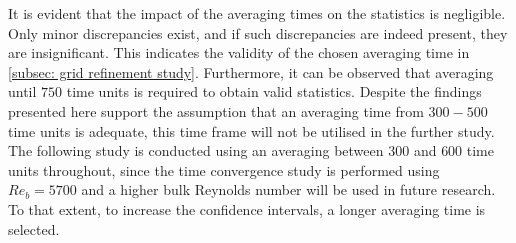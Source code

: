 It is evident that the impact of the averaging times on the statistics is negligible.
Only minor discrepancies exist, and if such discrepancies are indeed present, they are insignificant.
This indicates  the validity of the chosen averaging time in \autoref{subsec: grid refinement study}.
Furthermore, it can be observed that averaging until $750$ time units is required to obtain valid statistics.
Despite the findings presented here support the assumption that an averaging time from $300-500$ time units is adequate, this time frame will not be utilised in the further study.
The following study is conducted using an averaging between $300$ and $600$ time units throughout, since the time convergence study is performed using $Re_b = 5700$ and a higher bulk Reynolds number will be used in  future research.
To that extent, to increase the confidence intervals, a longer averaging time is selected.



